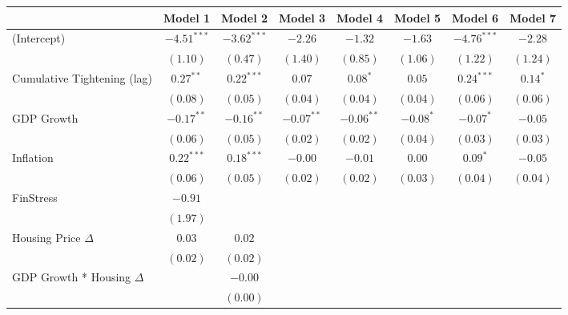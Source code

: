 
\begin{tabular}{l c c c c c c c }
\hline
 & Model 1 & Model 2 & Model 3 & Model 4 & Model 5 & Model 6 & Model 7 \\
\hline
(Intercept)                   & $-4.51^{***}$ & $-3.62^{***}$ & $-2.26$      & $-1.32$      & $-1.63$     & $-4.76^{***}$ & $-2.28$    \\
                              & $(1.10)$      & $(0.47)$      & $(1.40)$     & $(0.85)$     & $(1.06)$    & $(1.22)$      & $(1.24)$   \\
Cumulative Tightening (lag)   & $0.27^{**}$   & $0.22^{***}$  & $0.07$       & $0.08^{*}$   & $0.05$      & $0.24^{***}$  & $0.14^{*}$ \\
                              & $(0.08)$      & $(0.05)$      & $(0.04)$     & $(0.04)$     & $(0.04)$    & $(0.06)$      & $(0.06)$   \\
GDP Growth                    & $-0.17^{**}$  & $-0.16^{**}$  & $-0.07^{**}$ & $-0.06^{**}$ & $-0.08^{*}$ & $-0.07^{*}$   & $-0.05$    \\
                              & $(0.06)$      & $(0.05)$      & $(0.02)$     & $(0.02)$     & $(0.04)$    & $(0.03)$      & $(0.03)$   \\
Inflation                     & $0.22^{***}$  & $0.18^{***}$  & $-0.00$      & $-0.01$      & $0.00$      & $0.09^{*}$    & $-0.05$    \\
                              & $(0.06)$      & $(0.05)$      & $(0.02)$     & $(0.02)$     & $(0.03)$    & $(0.04)$      & $(0.04)$   \\
FinStress                     & $-0.91$       &               &              &              &             &               &            \\
                              & $(1.97)$      &               &              &              &             &               &            \\
Housing Price $\Delta$        & $0.03$        & $0.02$        &              &              &             &               &            \\
                              & $(0.02)$      & $(0.02)$      &              &              &             &               &            \\
GDP Growth * Housing $\Delta$ &               & $-0.00$       &              &              &             &               &            \\
                              &               & $(0.00)$      &              &              &             &               &            \\

\end{tabular}
